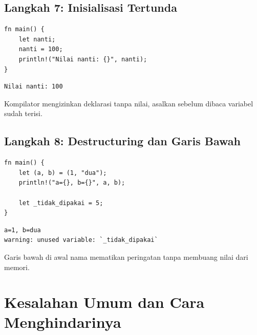 \documentclass[11pt,a4paper]{article}
\begin{document}
\subsection{Langkah 7: Inisialisasi Tertunda}

\begin{lstlisting}[style=code]
fn main() {
    let nanti;
    nanti = 100;
    println!("Nilai nanti: {}", nanti);
}
\end{lstlisting}

\begin{lstlisting}[style=out]
Nilai nanti: 100
\end{lstlisting}

Kompilator mengizinkan deklarasi tanpa nilai, asalkan sebelum dibaca variabel sudah terisi.

\subsection{Langkah 8: Destructuring dan Garis Bawah}

\begin{lstlisting}[style=code]
fn main() {
    let (a, b) = (1, "dua");
    println!("a={}, b={}", a, b);

    let _tidak_dipakai = 5;
}
\end{lstlisting}

\begin{lstlisting}[style=out]
a=1, b=dua
warning: unused variable: `_tidak_dipakai`
\end{lstlisting}

Garis bawah di awal nama mematikan peringatan tanpa membuang nilai dari memori.

\section{Kesalahan Umum dan Cara Menghindarinya}
\end{document}
